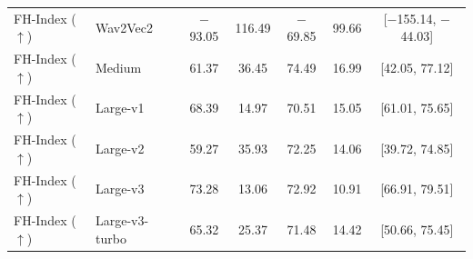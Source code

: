 \begin{table}[!t]
\begin{tabular}{llccccc}
FH-Index ($\uparrow$) & Wav2Vec2 & $-$93.05 & 116.49 & $-$69.85 & 99.66 & [$-$155.14, $-$44.03] \\
FH-Index ($\uparrow$) & Medium & 61.37 & 36.45 & 74.49 & 16.99 & [42.05, 77.12] \\
FH-Index ($\uparrow$) & Large-v1 & 68.39 & 14.97 & 70.51 & 15.05 & [61.01, 75.65] \\
FH-Index ($\uparrow$) & Large-v2 & 59.27 & 35.93 & 72.25 & 14.06 & [39.72, 74.85] \\
FH-Index ($\uparrow$) & Large-v3 & 73.28 & 13.06 & 72.92 & 10.91 & [66.91, 79.51] \\
FH-Index ($\uparrow$) & Large-v3-turbo & 65.32 & 25.37 & 71.48 & 14.42 & [50.66, 75.45] \\
\bottomrule
\end{tabular}
\end{table}
